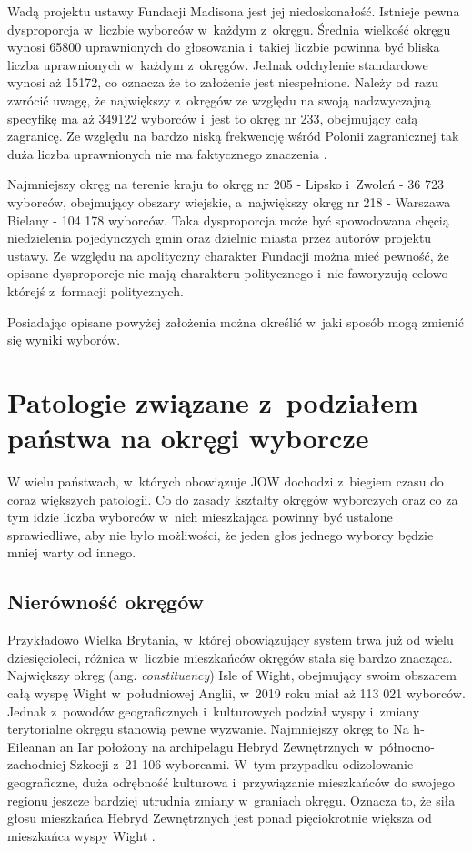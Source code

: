 Wadą projektu ustawy Fundacji Madisona jest jej niedoskonałość. Istnieje pewna dysproporcja w~liczbie wyborców w~każdym z~okręgu. Średnia wielkość okręgu wynosi 65800 uprawnionych do głosowania i~takiej liczbie powinna być bliska liczba uprawnionych w~każdym z~okręgów. Jednak odchylenie standardowe wynosi aż 15172, co oznacza że to założenie jest niespełnione. Należy od razu zwrócić uwagę, że największy z~okręgów ze względu na swoją nadzwyczajną specyfikę ma aż 349122 wyborców i~jest to okręg nr 233, obejmujący całą zagranicę. Ze względu na bardzo niską frekwencję wśród Polonii zagranicznej tak duża liczba uprawnionych nie ma faktycznego znaczenia \cite{Wilczyński}.

Najmniejszy okręg na terenie kraju to okręg nr 205 - Lipsko i~Zwoleń - 36 723 wyborców, obejmujący obszary wiejskie, a~największy okręg nr 218 - Warszawa Bielany - 104 178 wyborców. Taka dysproporcja może być spowodowana chęcią niedzielenia pojedynczych gmin oraz dzielnic miasta przez autorów projektu ustawy. Ze względu na apolityczny charakter Fundacji można mieć pewność, że opisane dysproporcje nie mają charakteru politycznego i~nie faworyzują celowo którejś z~formacji politycznych.

Posiadając opisane powyżej założenia można określić w~jaki sposób mogą zmienić się wyniki wyborów.

\section{Patologie związane z~podziałem państwa na okręgi wyborcze}
W wielu państwach, w~których obowiązuje JOW dochodzi z~biegiem czasu do coraz większych patologii. Co do zasady kształty okręgów wyborczych oraz co za tym idzie liczba wyborców w~nich mieszkająca powinny być ustalone sprawiedliwe, aby nie było możliwości, że jeden głos jednego wyborcy będzie mniej warty od innego.

\subsection{Nierówność okręgów}
Przykładowo Wielka Brytania, w~której obowiązujący system trwa już od wielu dziesięcioleci, różnica w~liczbie mieszkańców okręgów stała się bardzo znacząca. Największy okręg (ang. \textit{constituency}) Isle of Wight, obejmujący swoim obszarem całą wyspę Wight w~południowej Anglii, w~2019 roku miał aż 113 021 wyborców. Jednak z~powodów geograficznych i~kulturowych podział wyspy i~zmiany terytorialne okręgu stanowią pewne wyzwanie. Najmniejszy okręg to Na h-Eileanan an Iar położony na archipelagu Hebryd Zewnętrznych w~północno-zachodniej Szkocji z~21 106 wyborcami. W~tym przypadku odizolowanie geograficzne, duża odrębność kulturowa i~przywiązanie mieszkańców do swojego regionu jeszcze bardziej utrudnia zmiany w~graniach okręgu. Oznacza to, że siła głosu mieszkańca Hebryd Zewnętrznych jest ponad pięciokrotnie większa od mieszkańca wyspy Wight \cite{Baston}.


